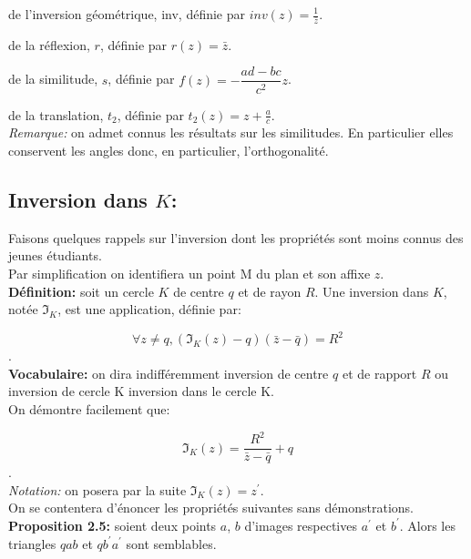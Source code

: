 \documentclass[a4paper, 12pt, twoside]{book}
\begin{document}
     de l'inversion géométrique, inv, définie par $inv(z)=\frac{1}{\bar{z}}$.\
     
     de la réflexion, $r$, définie par $r(z)=\bar{z}$.\
     
     de la similitude, $s$, définie par $f(z)=-\dfrac{ad-bc}{c^{2}}z$.\
     
     de la translation, $t_{2}$, définie par $t_{2}(z)=z+\frac{a}{c}$. \\
     
     
   
  \textit{Remarque:} on admet connus les résultats sur les similitudes. En particulier elles conservent les angles donc, en particulier, l'orthogonalité.\\
  
  \subsection{Inversion dans $K$:}
  
  Faisons quelques rappels sur l'inversion dont les propriétés sont moins connus des jeunes étudiants.\\
  
  Par simplification on identifiera un point M du plan et son affixe $z$.\\
  
  \textbf{Définition:} soit un cercle $K$ de centre $q$ et de rayon $R$. Une inversion dans $K$, notée $\Im_{K}$, est une application, définie par:\
  
 $$ \forall z\neq q, (\Im_{K}(z)-q)(\bar{z}-\bar{q})=R^{2}$$.\\
 
 \textbf{Vocabulaire:} on dira indifféremment inversion de centre $q$ et de rapport $R$ ou inversion de cercle K inversion dans le cercle K.\\
  
 
 On démontre facilement que:\
 
 $$\Im_{K}(z)=\dfrac{R^{2}}{\bar{z}-\bar{q}} +q$$.\\
 
 \textit{Notation:} on posera par la suite     $\Im_{K}(z)=z^{'}$.\\
 
 On se contentera d'énoncer les propriétés suivantes sans démonstrations.\\
 
 \textbf{Proposition 2.5:} soient deux points $a$, $b$ d'images respectives $a^{'}$ et $b^{'}$. Alors les triangles $qab$ et $qb^{'}a^{'}$ sont semblables.\\
 
\end{document}
